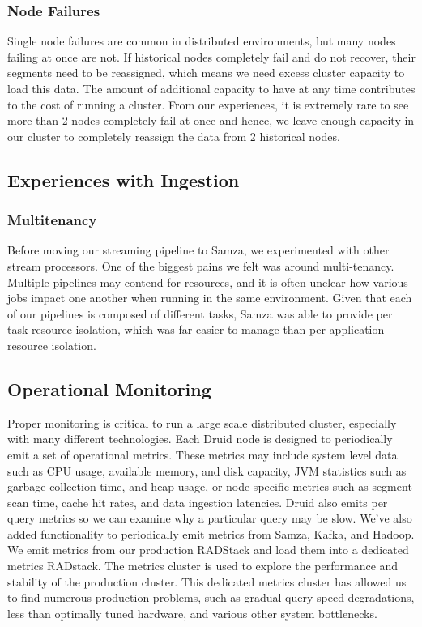 \documentclass{vldb}
\begin{document}
\subsubsection{Node Failures}
Single node failures are common in distributed environments, but many nodes
failing at once are not. If historical nodes completely fail and do not
recover, their segments need to be reassigned, which means we need excess
cluster capacity to load this data. The amount of additional capacity to have
at any time contributes to the cost of running a cluster. From our experiences,
it is extremely rare to see more than 2 nodes completely fail at once and
hence, we leave enough capacity in our cluster to completely reassign the data
from 2 historical nodes. 

\subsection{Experiences with Ingestion}
\subsubsection{Multitenancy}
Before moving our streaming pipeline to Samza, we experimented with other
stream processors. One of the biggest pains we felt was around multi-tenancy. Multiple
pipelines may contend for resources, and it is often unclear how various jobs
impact one another when running in the same environment. Given that each of our
pipelines is composed of different tasks, Samza was able to provide per task
resource isolation, which was far easier to manage than per application
resource isolation.

\subsection{Operational Monitoring}
Proper monitoring is critical to run a large scale distributed cluster,
especially with many different technologies. Each Druid node is designed to
periodically emit a set of operational metrics. These metrics may include
system level data such as CPU usage, available memory, and disk capacity, JVM
statistics such as garbage collection time, and heap usage, or node specific
metrics such as segment scan time, cache hit rates, and data ingestion
latencies. Druid also emits per query metrics so we can examine why a
particular query may be slow. We’ve also added functionality to periodically
emit metrics from Samza, Kafka, and Hadoop. We emit metrics from our production
RADStack and load them into a dedicated metrics RADstack. The metrics cluster
is used to explore the performance and stability of the production cluster.
This dedicated metrics cluster has allowed us to find numerous production
problems, such as gradual query speed degradations, less than optimally tuned
hardware, and various other system bottlenecks.
\end{document}
